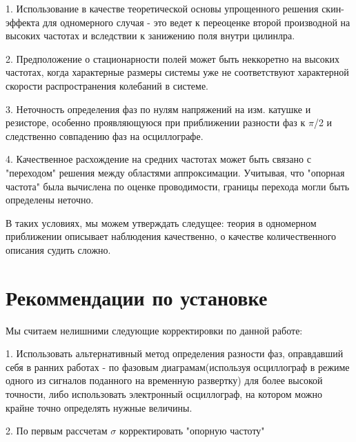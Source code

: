 \documentclass[a4paper,12pt]{article} %
\begin{document}
1. Использование в качестве теоретической основы упрощенного решения скин-эффекта для одномерного случая - это ведет к переоценке второй производной на высоких частотах и вследствии к занижению поля внутри цилинлра.

2. Предположение о стационарности полей может быть неккоретно на высоких частотах, когда характерные размеры системы уже не соответствуют характерной скорости распространения колебаний в системе.

3. Неточность определения фаз по нулям напряжений на изм. катушке и резисторе, особенно проявляющуюся при приближении разности фаз к $\pi$/2 и следственно совпадению фаз на осциллографе.

4. Качественное расхождение на средних частотах может быть связано с "переходом" решения между областями аппроксимации. Учитывая, что "опорная частота" была вычислена по оценке проводимости, границы перехода могли быть определены неточно.

В таких условиях, мы можем утверждать следущее: теория в одномерном приближении описывает наблюдения качественно, о качестве количественного описания судить сложно.

\section{Рекоммендации по установке}

Мы считаем нелишними следующие корректировки по данной работе:

1. Использовать альтернативный метод определения разности фаз, оправдавший себя в ранних работах - по фазовым диаграмам(используя осциллограф в режиме одного из сигналов поданного на временную развертку) для более высокой точности, либо использовать электронный осциллограф, на котором можно крайне точно определять нужные величины.

2. По первым рассчетам $\sigma$ корректировать "опорную частоту"
\end{document}
